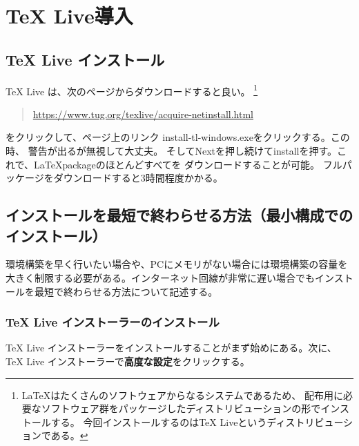 \documentclass[titlepage]{ltjsarticle}
\begin{document}
\section{TeX Live導入}

\subsection{TeX Live インストール}
TeX Live は、次のページからダウンロードすると良い。
\footnote{
  \LaTeX はたくさんのソフトウェアからなるシステムであるため、
  配布用に必要なソフトウェア群をパッケージしたディストリビューションの形でインストールする。
  今回インストールするのはTeX Liveというディストリビューションである。
}

\begin{quote}
  \centering
	\url{https://www.tug.org/texlive/acquire-netinstall.html}

\end{quote}
をクリックして、ページ上のリンク install-tl-windows.exeをクリックする。この時、
警告が出るが無視して大丈夫。
そしてNextを押し続けてinstallを押す。これで、\LaTeX packageのほとんどすべてを
ダウンロードすることが可能。
フルパッケージをダウンロードすると3時間程度かかる。
\subsection{インストールを最短で終わらせる方法（最小構成でのインストール）}
環境構築を早く行いたい場合や、PCにメモリがない場合には環境構築の容量を大きく制限する必要がある。インターネット回線が非常に遅い場合でもインストールを最短で終わらせる方法について記述する。
\subsubsection{TeX Live インストーラーのインストール}
TeX Live インストーラーをインストールすることがまず始めにある。次に、TeX Live インストーラーで\textbf{高度な設定}をクリックする。
\end{document}
